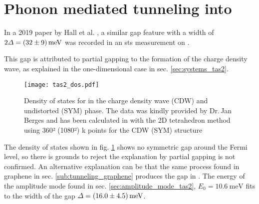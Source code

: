 \documentclass[main.tex]{subfiles}
\begin{document}
\section{Phonon mediated tunneling into \TaS}

In a 2019 paper by Hall et al. \cite{hall_environmental_2019}, a similar gap feature with a width of \(2 \Delta = \SI[separate-uncertainty = true]{32 \pm 9}{\milli\eV}\) was recorded in an \acrshort{sts} measurement on \TaS.

This gap is attributed to partial gapping to the formation of the charge density wave, as explained in the one-dimensional case in sec. \ref{sec:systems_tas2}.

\begin{figure}[htb!]
    \centering
    \texttt{[image: tas2\_dos.pdf]}
    \caption{Density of states for \TaS in the charge density wave (CDW) and undistorted (SYM) phase. The data was kindly provided by Dr.\,Jan Berges and has been calculated in \QE with the 2D tetrahedron method using 360² (1080²) k points for the CDW (SYM) structure}
    \label{fig:tas2_dos}
\end{figure}
The density of states shown in fig. \ref{fig:tas2_dos} shows no symmetric gap around the Fermi level, so there is grounds to reject the explanation by partial gapping is not confirmed.
An alternative explanation can be that the same process found in graphene in sec. \ref{sub:tunneling_graphene} produces the gap in \TaS.
The energy of the amplitude mode found in sec. \ref{sec:amplitude_mode_tas2}, \(E_0 = \SI{10.6}{\milli\eV}\) fits to the width of the gap \(\Delta = \SI[separate-uncertainty = true]{16 \pm 4.5}{\milli\eV}\).
\end{document}
